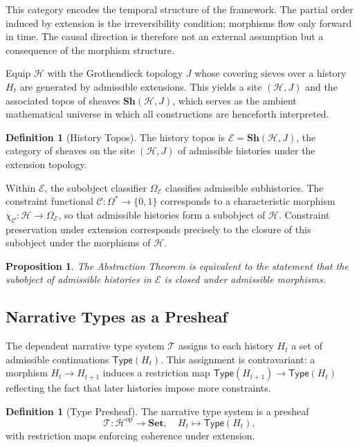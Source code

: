 \documentclass[12pt, a4paper]{article}
\theoremstyle{plain}
\newtheorem{proposition}[theorem]{Proposition}
\theoremstyle{definition}
\newtheorem{definition}[theorem]{Definition}
\theoremstyle{remark}
\begin{document}
This category encodes the temporal structure of the framework. The partial order induced by extension is the irreversibility condition; morphisms flow only forward in time. The causal direction is therefore not an external assumption but a consequence of the morphism structure.

Equip $\mathcal{H}$ with the Grothendieck topology $J$ whose covering sieves over a history $H_t$ are generated by admissible extensions. This yields a site $(\mathcal{H}, J)$ and the associated topos of sheaves $\mathbf{Sh}(\mathcal{H}, J)$, which serves as the ambient mathematical universe in which all constructions are henceforth interpreted.

\begin{definition}[History Topos]
The history topos is $\mathcal{E} = \mathbf{Sh}(\mathcal{H}, J)$, the category of sheaves on the site $(\mathcal{H}, J)$ of admissible histories under the extension topology.
\end{definition}

Within $\mathcal{E}$, the subobject classifier $\Omega_{\mathcal{E}}$ classifies admissible subhistories. The constraint functional $\mathcal{C} : \Omega^* \to \{0,1\}$ corresponds to a characteristic morphism $\chi_{\mathcal{C}} : \mathcal{H} \to \Omega_{\mathcal{E}}$, so that admissible histories form a subobject of $\mathcal{H}$. Constraint preservation under extension corresponds precisely to the closure of this subobject under the morphisms of $\mathcal{H}$.

\begin{proposition}
The Abstraction Theorem is equivalent to the statement that the subobject of admissible histories in $\mathcal{E}$ is closed under admissible morphisms.
\end{proposition}

\subsection{Narrative Types as a Presheaf}

The dependent narrative type system $\mathcal{T}$ assigns to each history $H_t$ a set of admissible continuations $\mathsf{Type}(H_t)$. This assignment is contravariant: a morphism $H_t \to H_{t+1}$ induces a restriction map $\mathsf{Type}(H_{t+1}) \to \mathsf{Type}(H_t)$ reflecting the fact that later histories impose more constraints.

\begin{definition}[Type Presheaf]
The narrative type system is a presheaf
\[
\mathcal{T} : \mathcal{H}^{\mathrm{op}} \to \mathbf{Set},
\quad H_t \mapsto \mathsf{Type}(H_t),
\]
with restriction maps enforcing coherence under extension.
\end{definition}
\end{document}
